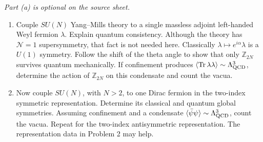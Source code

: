 \textit{Part (a) is optional on the source sheet.}
\begin{enumerate}[label=\alph*)]
    \item Couple $SU(N)$ Yang--Mills theory to a single massless
    adjoint left-handed Weyl fermion $\lambda$. Explain quantum
    consistency. Although the theory has $\mathcal N=1$
    supersymmetry, that fact is not needed here. Classically
    $\lambda\mapsto e^{i\alpha}\lambda$ is a $U(1)$ symmetry.
    Follow the shift of the theta angle to show that only
    $\mathbb Z_{2N}$ survives quantum mechanically. If confinement
    produces $\langle\operatorname{Tr}\lambda\lambda\rangle
    \sim\Lambda_{\rm QCD}^3$, determine the action of
    $\mathbb Z_{2N}$ on this condensate and count the vacua.

    \item Now couple $SU(N)$, with $N>2$, to one Dirac fermion in
    the two-index symmetric representation. Determine its classical
    and quantum global symmetries. Assuming confinement and a
    condensate $\langle\bar\psi\psi\rangle
    \sim\Lambda_{\rm QCD}^3$, count the vacua. Repeat for the
    two-index antisymmetric representation. The representation
    data in Problem 2 may help.
\end{enumerate}

